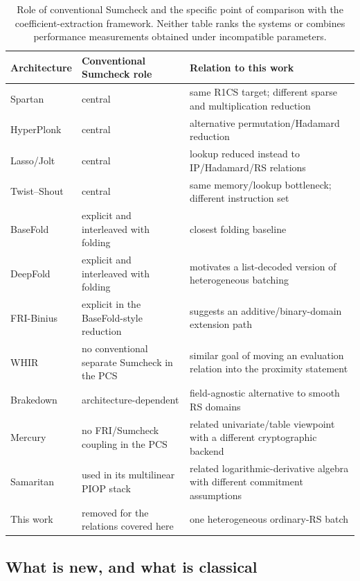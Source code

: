 \begin{table}[!ht]
\centering
\footnotesize
\begin{tabular}{@{}>{\raggedright\arraybackslash}p{2.65cm}>{\raggedright\arraybackslash}p{4.15cm}>{\raggedright\arraybackslash}p{7.15cm}@{}}
\toprule
Architecture & Conventional Sumcheck role & Relation to this work \\
\midrule
Spartan & central & same R1CS target; different sparse and multiplication reduction \\
HyperPlonk & central & alternative permutation/Hadamard reduction \\
Lasso/Jolt & central & lookup reduced instead to IP/Hadamard/RS relations \\
Twist--Shout & central & same memory/lookup bottleneck; different instruction set \\
BaseFold & explicit and interleaved with folding & closest folding baseline \\
DeepFold & explicit and interleaved with folding & motivates a list-decoded version of heterogeneous batching \\
FRI-Binius & explicit in the BaseFold-style reduction & suggests an additive/binary-domain extension path \\
WHIR & no conventional separate Sumcheck in the PCS & similar goal of moving an evaluation relation into the proximity statement \\
Brakedown & architecture-dependent & field-agnostic alternative to smooth RS domains \\
Mercury & no FRI/Sumcheck coupling in the PCS & related univariate/table viewpoint with a different cryptographic backend \\
Samaritan & used in its multilinear PIOP stack & related logarithmic-derivative algebra with different commitment assumptions \\
This work & removed for the relations covered here & one heterogeneous ordinary-RS batch \\
\bottomrule
\end{tabular}
\caption{Role of conventional Sumcheck and the specific point of comparison with the coefficient-extraction framework.  Neither table ranks the systems or combines performance measurements obtained under incompatible parameters.}
\label{tab:sumcheck-role-comparison}
\end{table}
\clearpage

\subsection{What is new, and what is classical}
\label{sec:comparison-novelty}

